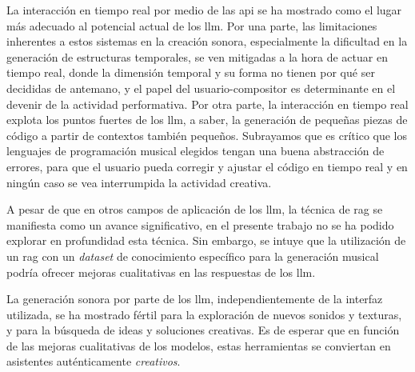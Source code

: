 La interacción en tiempo real por medio de las \gls{api} se ha mostrado como el lugar más adecuado al potencial actual de los \gls{llm}. Por una parte, las limitaciones inherentes a estos sistemas en la creación sonora, especialmente la dificultad en la generación de estructuras temporales, se ven mitigadas a la hora de actuar en tiempo real, donde la dimensión temporal y su forma no tienen por qué ser decididas de antemano, y el papel del usuario-compositor es determinante en el devenir de la actividad performativa. Por otra parte, la interacción en tiempo real explota los puntos fuertes de los \gls{llm}, a saber, la generación de pequeñas piezas de código a partir de contextos también pequeños. Subrayamos que es crítico que los lenguajes de programación musical elegidos tengan una buena abstracción de errores, para que el usuario pueda corregir y ajustar el código en tiempo real y en ningún caso se vea interrumpida la actividad creativa.

A pesar de que en otros campos de aplicación de los \gls{llm}, la técnica de \gls{rag} se manifiesta como un avance significativo, en el presente trabajo no se ha podido explorar en profundidad esta técnica. Sin embargo, se intuye que la utilización de un \gls{rag} con un \emph{dataset} de conocimiento específico para la generación musical podría ofrecer mejoras cualitativas en las respuestas de los \gls{llm}.

La generación sonora por parte de los \gls{llm}, independientemente de la interfaz utilizada, se ha mostrado fértil para la exploración de nuevos sonidos y texturas, y para la búsqueda de ideas y soluciones creativas. Es de esperar que en función de las mejoras cualitativas de los modelos, estas herramientas se conviertan en asistentes auténticamente \emph{creativos}. 






